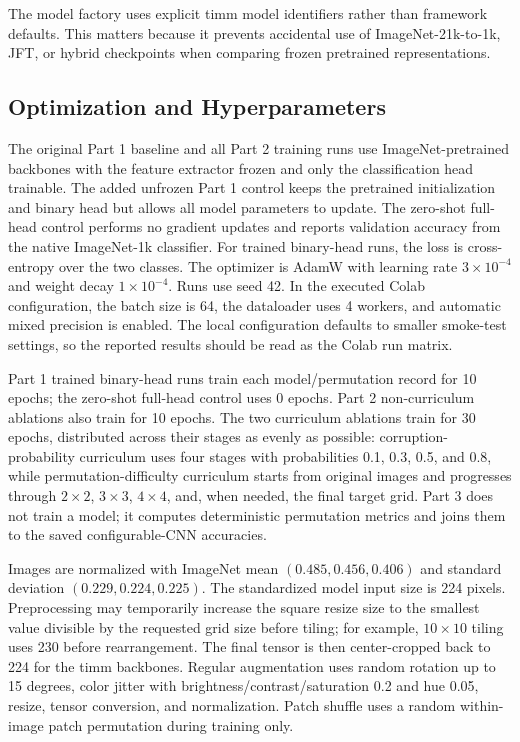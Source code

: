 \documentclass[12pt]{article}
\begin{document}
The model factory uses explicit timm model identifiers rather than framework defaults. This matters because it prevents accidental use of ImageNet-21k-to-1k, JFT, or hybrid checkpoints when comparing frozen pretrained representations.

\subsection{Optimization and Hyperparameters}

The original Part 1 baseline and all Part 2 training runs use ImageNet-pretrained backbones with the feature extractor frozen and only the classification head trainable. The added unfrozen Part 1 control keeps the pretrained initialization and binary head but allows all model parameters to update. The zero-shot full-head control performs no gradient updates and reports validation accuracy from the native ImageNet-1k classifier. For trained binary-head runs, the loss is cross-entropy over the two classes. The optimizer is AdamW with learning rate $3 \times 10^{-4}$ and weight decay $1 \times 10^{-4}$. Runs use seed 42. In the executed Colab configuration, the batch size is 64, the dataloader uses 4 workers, and automatic mixed precision is enabled. The local configuration defaults to smaller smoke-test settings, so the reported results should be read as the Colab run matrix.

Part 1 trained binary-head runs train each model/permutation record for 10 epochs; the zero-shot full-head control uses 0 epochs. Part 2 non-curriculum ablations also train for 10 epochs. The two curriculum ablations train for 30 epochs, distributed across their stages as evenly as possible: corruption-probability curriculum uses four stages with probabilities 0.1, 0.3, 0.5, and 0.8, while permutation-difficulty curriculum starts from original images and progresses through $2 \times 2$, $3 \times 3$, $4 \times 4$, and, when needed, the final target grid. Part 3 does not train a model; it computes deterministic permutation metrics and joins them to the saved configurable-CNN accuracies.

Images are normalized with ImageNet mean $(0.485, 0.456, 0.406)$ and standard deviation $(0.229, 0.224, 0.225)$. The standardized model input size is 224 pixels. Preprocessing may temporarily increase the square resize size to the smallest value divisible by the requested grid size before tiling; for example, $10 \times 10$ tiling uses 230 before rearrangement. The final tensor is then center-cropped back to 224 for the timm backbones. Regular augmentation uses random rotation up to 15 degrees, color jitter with brightness/contrast/saturation 0.2 and hue 0.05, resize, tensor conversion, and normalization. Patch shuffle uses a random within-image patch permutation during training only.
\end{document}
